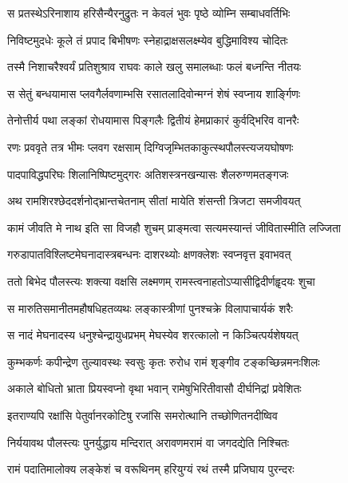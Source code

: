 \twolineshloka
{स प्रतस्थेऽरिनाशाय हरिसैन्यैरनुद्रुतः}
{न केवलं भुवः पृष्ठे व्योम्नि सम्बाधवर्तिभिः} %

\twolineshloka
{निविष्टमुदधेः कूले तं प्रपाद बिभीषणः}
{स्नेहाद्राक्षसलक्ष्म्येव बुद्धिमाविश्य चोदितः} %

\twolineshloka
{तस्मै निशाचरैश्वर्यं प्रतिशुश्राव राघवः}
{काले खलु समालब्धाः फलं बध्नन्ति नीतयः} %

\twolineshloka
{स सेतुं बन्धयामास प्लवगैर्लवणाम्भसि}
{रसातलादिवोन्मग्नं शेषं स्वप्नाय शार्ङ्गिणः} %

\twolineshloka
{तेनोत्तीर्य पथा लङ्कां रोधयामास पिङ्गलैः}
{द्वितीयं हेमप्राकारं कुर्वद्भिरिव वानरैः} %

\twolineshloka
{रणः प्रववृते तत्र भीमः प्लवग रक्षसाम्}
{दिग्विजृम्भितकाकुत्स्थपौलस्त्यजयघोषणः} %

\twolineshloka
{पादपाविद्धपरिघः शिलानिष्पिष्टमुद्गरः}
{अतिशस्त्रनखन्यासः शैलरुग्णमतङ्गजः} %

\twolineshloka
{अथ रामशिरश्छेददर्शनोद्भ्रान्तचेतनाम्}
{सीतां मायेति शंसन्ती त्रिजटा समजीवयत्} %

\twolineshloka
{कामं जीवति मे नाथ इति सा विजहौ शुचम्}
{प्राङ्मत्वा सत्यमस्यान्तं जीवितास्मीति लज्जिता} %

\twolineshloka
{गरुडापातविश्लिष्टमेघनादास्त्रबन्धनः}
{दाशरथ्योः क्षणक्लेशः स्वप्नवृत्त इवाभवत्} %

\twolineshloka
{ततो बिभेद पौलस्त्यः शक्त्या वक्षसि लक्ष्मणम्}
{रामस्त्वनाहतोऽप्यासीद्विदीर्णहॄदयः शुचा} %

\twolineshloka
{स मारुतिसमानीतमहौषधिहतव्यथः}
{लङ्कास्त्रीणां पुनश्चक्रे विलापाचार्यकं शरैः} %

\twolineshloka
{स नादं मेघनादस्य धनुश्चेन्द्रायुधप्रभम्}
{मेघस्येव शरत्कालो न किञ्चित्पर्यशेषयत्} %

\twolineshloka
{कुम्भकर्णः कपीन्द्रेण तुल्यावस्थः स्वसुः कृतः}
{रुरोध रामं शृङ्गीव टङ्कच्छिन्नमनःशिलः} %

\twolineshloka
{अकाले बोधितो भ्राता प्रियस्वप्नो वृथा भवान्}
{रामेषुभिरितीवासौ दीर्घनिद्रां प्रवेशितः} %

\twolineshloka
{इतराण्यपि रक्षांसि पेतुर्वानरकोटिषु}
{रजांसि समरोत्थानि तच्छोणितनदीष्विव} %

\twolineshloka
{निर्ययावथ पौलस्त्यः पुनर्युद्धाय मन्दिरात्}
{अरावणमरामं वा जगदद्येति निश्चितः} %

\twolineshloka
{रामं पदातिमालोक्य लङ्केशं च वरूथिनम्}
{हरियुग्यं रथं तस्मै प्रजिघाय पुरन्दरः} %

